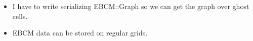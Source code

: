 \begin{itemize}
\item  I have to write serializing EBCM::Graph so we can get the graph
  over ghost cells.
\item EBCM data can be stored on regular grids.

\end{itemize}  
